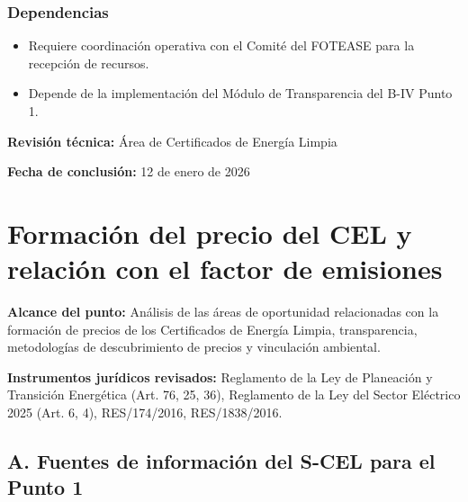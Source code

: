 \documentclass{cel}
\begin{document}
\subsubsection{Dependencias}
\nopagebreak

\begin{itemize}
\item Requiere coordinación operativa con el Comité del FOTEASE para la recepción de recursos.
\item Depende de la implementación del Módulo de Transparencia del B-IV Punto 1.


\end{itemize}
\textbf{Revisión técnica:} Área de Certificados de Energía Limpia

\textbf{Fecha de conclusión:} 12 de enero de 2026


\clearpage
{}
{}
\section*{Formación del precio del CEL y relación con el factor de emisiones}
\nopagebreak

\textbf{Alcance del punto:} Análisis de las áreas de oportunidad relacionadas con la formación de precios de los Certificados de Energía Limpia, transparencia, metodologías de descubrimiento de precios y vinculación ambiental.

\textbf{Instrumentos jurídicos revisados:} Reglamento de la Ley de Planeación y Transición Energética (Art. 76, 25, 36), Reglamento de la Ley del Sector Eléctrico 2025 (Art. 6, 4), RES/174/2016, RES/1838/2016.


\vspace{0.4cm}
\subsection{A. Fuentes de información del S-CEL para el Punto 1}
\nopagebreak
\end{document}

